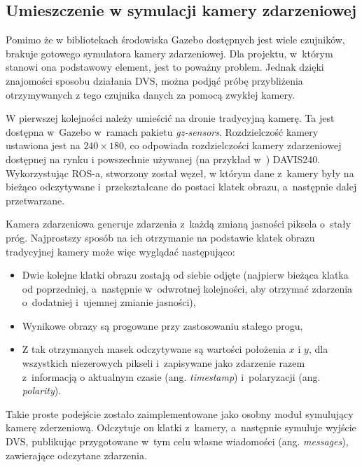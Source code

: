 
\subsection{Umieszczenie w symulacji kamery zdarzeniowej}

Pomimo że w bibliotekach środowiska Gazebo dostępnych jest wiele czujników, brakuje gotowego symulatora kamery zdarzeniowej. Dla projektu, w~którym stanowi ona podstawowy element, jest to poważny problem. Jednak dzięki znajomości sposobu działania DVS, można podjąć próbę przybliżenia otrzymywanych z tego czujnika danych za pomocą zwykłej kamery.

W pierwszej kolejności należy umieścić na dronie tradycyjną kamerę. Ta jest dostępna w~Gazebo w~ramach pakietu \textit{gz-sensors}. Rozdzielczość kamery ustawiona jest na $240 \times 180$, co odpowiada rozdzielczości kamery zdarzeniowej dostępnej na rynku i powszechnie używanej (na przykład w~\cite{night_obstacle}) DAVIS240. Wykorzystując ROS-a, stworzony został węzeł, w którym dane z~kamery były na bieżąco odczytywane i~przekształcane do postaci klatek obrazu, a~następnie dalej przetwarzane.

Kamera zdarzeniowa generuje zdarzenia z~każdą zmianą jasności piksela o~stały próg. Najprostszy sposób na ich otrzymanie na podstawie klatek obrazu tradycyjnej kamery może więc wyglądać następująco:
\begin{itemize}
    \item Dwie kolejne klatki obrazu zostają od siebie odjęte (najpierw bieżąca klatka od poprzedniej, a~następnie w~odwrotnej kolejności, aby otrzymać zdarzenia o~dodatniej i~ujemnej zmianie jasności),
    \item Wynikowe obrazy są progowane przy zastosowaniu stałego progu,
    \item Z tak otrzymanych masek odczytywane są wartości położenia $x$ i $y$, dla wszystkich niezerowych pikseli i~zapisywane jako zdarzenie razem z~informacją o aktualnym czasie (ang. \textit{timestamp}) i~polaryzacji (ang. \textit{polarity}).
\end{itemize}

Takie proste podejście zostało zaimplementowane jako osobny moduł symulujący kamerę zderzeniową. Odczytuje on klatki z~kamery, a~następnie symuluje wyjście DVS, publikując przygotowane w~tym celu własne wiadomości (ang. \textit{messages}), zawierające odczytane zdarzenia.

